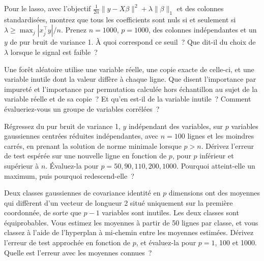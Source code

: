 \begin{question}\label{iq:iv1:machine-learning:41}
Pour le lasso, avec l'objectif $\frac{1}{2n}\|y - X\beta\|^2 + \lambda\|\beta\|_1$ et des colonnes standardisées, montrez que tous les coefficients sont nuls si et seulement si $\lambda \ge \max_j|x_j^\top y|/n$. Prenez $n = 1000$, $p = 1000$, des colonnes indépendantes et un $y$ de pur bruit de variance 1. À quoi correspond ce seuil~? Que dit-il du choix de $\lambda$ lorsque le signal est faible~?
\end{question}

\begin{question}\label{iq:iv1:machine-learning:42}
Une forêt aléatoire utilise une variable réelle, une copie exacte de celle-ci, et une variable inutile dont la valeur diffère à chaque ligne. Que disent l'importance par impureté et l'importance par permutation calculée hors échantillon au sujet de la variable réelle et de sa copie~? Et qu'en est-il de la variable inutile~? Comment évalueriez-vous un groupe de variables corrélées~?
\end{question}

\begin{question}\label{iq:iv1:machine-learning:43}
Régressez du pur bruit de variance 1, $y$ indépendant des variables, sur $p$ variables gaussiennes centrées réduites indépendantes, avec $n = 100$ lignes et les moindres carrés, en prenant la solution de norme minimale lorsque $p > n$. Dérivez l'erreur de test espérée sur une nouvelle ligne en fonction de $p$, pour $p$ inférieur et supérieur à $n$. Évaluez-la pour $p = 50, 90, 110, 200, 1000$. Pourquoi atteint-elle un maximum, puis pourquoi redescend-elle~?
\end{question}

\begin{question}\label{iq:iv1:machine-learning:44}
Deux classes gaussiennes de covariance identité en $p$ dimensions ont des moyennes qui diffèrent d'un vecteur de longueur 2 situé uniquement sur la première coordonnée, de sorte que $p - 1$ variables sont inutiles. Les deux classes sont équiprobables. Vous estimez les moyennes à partir de 50 lignes par classe, et vous classez à l'aide de l'hyperplan à mi-chemin entre les moyennes estimées. Dérivez l'erreur de test approchée en fonction de $p$, et évaluez-la pour $p = 1$, 100 et 1000. Quelle est l'erreur avec les moyennes connues~?
\end{question}

